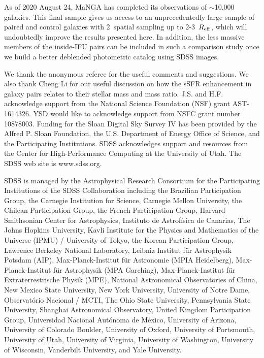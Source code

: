 \documentclass[apj,twocolumn]{emulateapj}
\newcommand{\reff}{$R_{\rm eff}$}
\begin{document}
\begin{CJK*}{UTF8}{gbsn}
\begin{enumerate}
\end{enumerate}

As of 2020 August 24, MaNGA has completed its observations of $\sim$10,000 galaxies. This final sample gives us access to an unprecedentedly large sample of paired and control galaxies with 2\arcsec\ spatial sampling up to 2-3~\reff, which will undoubtedly improve the results presented here. In addition, the less massive members of the inside-IFU pairs can be included in such a comparison study once we build a better deblended photometric catalog using SDSS images.

\acknowledgments

We thank the anonymous referee for the useful comments and suggestions. We also thank Cheng Li for our useful discussion on how the sSFR enhancement in galaxy pairs relates to their stellar mass and mass ratio. J.S. and H.F. acknowledge support from the National Science Foundation (NSF) grant AST-1614326. YSD would like to acknowledge support from NSFC grant number 10878003. Funding for the Sloan Digital Sky Survey IV has been provided by the Alfred P. Sloan Foundation, the U.S. Department of Energy Office of Science, and the Participating Institutions. SDSS acknowledges support and resources from the Center for High-Performance Computing at the University of Utah. The SDSS web site is www.sdss.org.

SDSS is managed by the Astrophysical Research Consortium for the Participating Institutions of the SDSS Collaboration including the Brazilian Participation Group, the Carnegie Institution for Science, Carnegie Mellon University, the Chilean Participation Group, the French Participation Group, Harvard-Smithsonian Center for Astrophysics, Instituto de Astrofísica de Canarias, The Johns Hopkins University, Kavli Institute for the Physics and Mathematics of the Universe (IPMU) / University of Tokyo, the Korean Participation Group, Lawrence Berkeley National Laboratory, Leibniz Institut für Astrophysik Potsdam (AIP), Max-Planck-Institut für Astronomie (MPIA Heidelberg), Max-Planck-Institut für Astrophysik (MPA Garching), Max-Planck-Institut für Extraterrestrische Physik (MPE), National Astronomical Observatories of China, New Mexico State University, New York University, University of Notre Dame, Observatório Nacional / MCTI, The Ohio State University, Pennsylvania State University, Shanghai Astronomical Observatory, United Kingdom Participation Group, Universidad Nacional Autónoma de México, University of Arizona, University of Colorado Boulder, University of Oxford, University of Portsmouth, University of Utah, University of Virginia, University of Washington, University of Wisconsin, Vanderbilt University, and Yale University.

\end{CJK*} 


\end{document}
